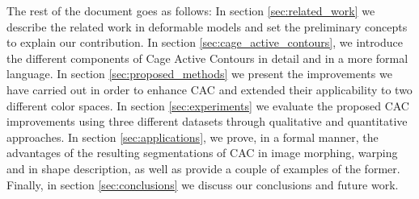 The rest of the document goes as follows: In section \ref{sec:related_work} we describe the related work in deformable models and set the preliminary concepts to explain our contribution. In section \ref{sec:cage_active_contours}, we introduce the different components of Cage Active Contours in detail and in a more formal language. In section \ref{sec:proposed_methods} we present the improvements we have carried out in order to enhance CAC and extended their applicability to two different color spaces. In section \ref{sec:experiments} we evaluate the proposed CAC improvements using three different datasets through qualitative and quantitative approaches. In section \ref{sec:applications}, we prove, in a formal manner, the advantages of the resulting segmentations of CAC in image morphing, warping and in shape description, as well as provide a couple of examples of the former. Finally, in section \ref{sec:conclusions} we discuss our conclusions and future work.